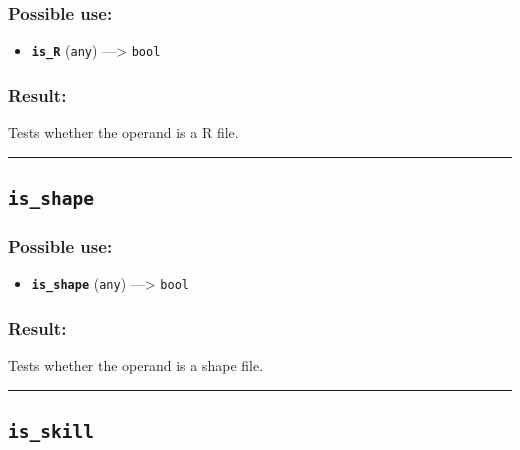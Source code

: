 \documentclass[]{book}
\providecommand{\tightlist}{%
  \setlength{\itemsep}{0pt}\setlength{\parskip}{0pt}}
\theoremstyle{definition}
\theoremstyle{definition}
\theoremstyle{definition}
\theoremstyle{remark}
\begin{document}
\subsubsection{Possible use:}\label{possible-use-301}

\begin{itemize}
\tightlist
\item
  \textbf{\texttt{is\_R}} (\texttt{any}) ---\textgreater{} \texttt{bool}
\end{itemize}

\subsubsection{Result:}\label{result-291}

Tests whether the operand is a R file.

\begin{center}\rule{0.5\linewidth}{\linethickness}\end{center}

\subsection{\texorpdfstring{\texttt{is\_shape}}{is\_shape}}\label{is_shape}

\subsubsection{Possible use:}\label{possible-use-302}

\begin{itemize}
\tightlist
\item
  \textbf{\texttt{is\_shape}} (\texttt{any}) ---\textgreater{}
  \texttt{bool}
\end{itemize}

\subsubsection{Result:}\label{result-292}

Tests whether the operand is a shape file.

\begin{center}\rule{0.5\linewidth}{\linethickness}\end{center}

\subsection{\texorpdfstring{\texttt{is\_skill}}{is\_skill}}\label{is_skill}
\end{document}
